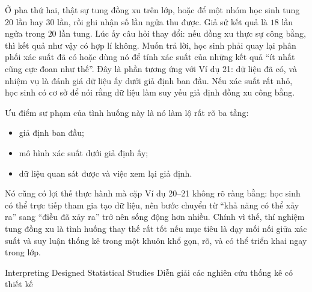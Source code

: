 {    Ở pha thứ hai, thật sự tung đồng xu trên lớp, hoặc để một nhóm học sinh tung $20$ lần hay $30$ lần, rồi ghi nhận số lần ngửa thu được. Giả sử kết quả là $18$ lần ngửa trong $20$ lần tung. Lúc ấy câu hỏi thay đổi: nếu đồng xu thực sự công bằng, thì kết quả như vậy có hợp lí không. Muốn trả lời, học sinh phải quay lại phân phối xác suất đã có hoặc dùng nó để tính xác suất của những kết quả ``ít nhất cũng cực đoan như thế''. Đây là phần tương ứng với Ví dụ 21: dữ liệu đã có, và nhiệm vụ là đánh giá dữ liệu ấy dưới giả định ban đầu. Nếu xác suất rất nhỏ, học sinh có cơ sở để nói rằng dữ liệu làm suy yếu giả định đồng xu công bằng.

    Ưu điểm sư phạm của tình huống này là nó làm lộ rất rõ ba tầng:

    \begin{itemize}
      \item giả định ban đầu;
      \item mô hình xác suất dưới giả định ấy;
      \item dữ liệu quan sát được và việc xem lại giả định.
    \end{itemize}

    Nó cũng có lợi thế thực hành mà cặp Ví dụ 20--21 không rõ ràng bằng: học sinh có thể trực tiếp tham gia tạo dữ liệu, nên bước chuyển từ ``khả năng có thể xảy ra'' sang ``điều đã xảy ra'' trở nên sống động hơn nhiều. Chính vì thế, thí nghiệm tung đồng xu là tình huống thay thế rất tốt nếu mục tiêu là dạy mối nối giữa xác suất và suy luận thống kê trong một khuôn khổ gọn, rõ, và có thể triển khai ngay trong lớp.
  }

\ParallelSection
  {Interpreting Designed Statistical Studies}
  {Diễn giải các nghiên cứu thống kê có thiết kế}
  {}

